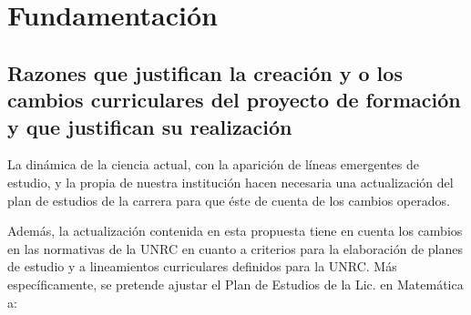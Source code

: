 \documentclass[a4paper, 12pt]{article}
\begin{document}
\section{Fundamentación}

\subsection{Razones que justifican la creación y o los cambios curriculares del proyecto de formación  y que justifican su realización}

La dinámica de la ciencia actual, con la aparición de líneas emergentes  de estudio,  y la propia  de nuestra institución hacen necesaria una actualización del plan de estudios de la carrera para que éste de cuenta de los cambios operados.   


Además, la actualización  contenida en esta propuesta  tiene en cuenta los   cambios en las normativas de la UNRC en cuanto a criterios para la elaboración de  planes de estudio y a lineamientos curriculares definidos para la UNRC. Más específicamente, se pretende  ajustar el Plan de Estudios de la Lic. en Matemática a:
\end{document}
